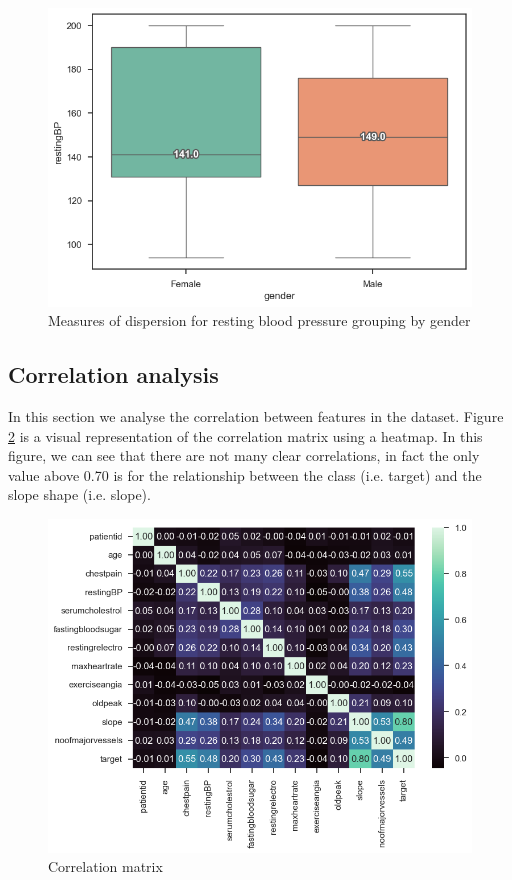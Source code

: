 \begin{figure}[H]
    \caption{Measures of dispersion for resting blood pressure grouping by gender}\label{boxplot-bp-gender}
    \centering
    \includegraphics[width=\linewidth]{media/boxplot-08-gender-bp.png}
\end{figure}


\subsection{Correlation analysis}

In this section we analyse the correlation between features in the dataset. Figure \ref{correlation-matrix}
is a visual representation of the correlation matrix using a heatmap. In this figure, we can see that there
are not many clear correlations, in fact the only value above 0.70 is for the relationship between the class
(i.e. target) and the slope shape (i.e. slope).

\begin{figure}[H]
    \caption{Correlation matrix}\label{correlation-matrix}
    \centering
    \includegraphics[width=\linewidth]{media/correlation-matrix.png}
\end{figure}

